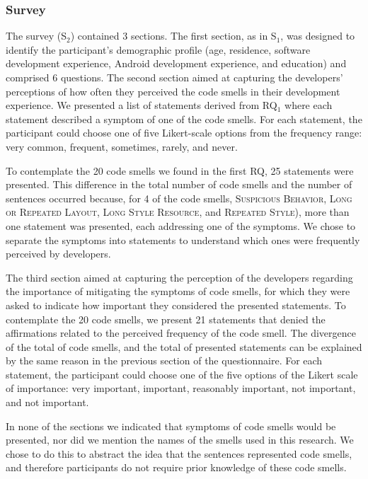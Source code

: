 \subsubsection{Survey}
\label{etapa-2-questionario}

The survey (S$_2$) contained 3 sections. 
The first section, as in S$_1$, was designed to identify the participant's demographic profile 
(age, residence, software development experience, Android development experience, and education) and comprised 6 questions.
The second section aimed at capturing the developers' perceptions of how often they perceived the code smells in their development experience. We presented a list of statements derived from RQ$_1$ where each statement described a symptom of one of the code smells. For each statement, the participant could choose one of five Likert-scale options from the frequency range: very common, frequent, sometimes, rarely, and never.


To contemplate the 20 code smells we found in the first RQ, 25 statements were presented. This difference in the total number of code smells and the number of sentences occurred because, for 4 of the code smells, \textsc{Suspicious Behavior}, 
\textsc{Long or Repeated Layout}, \textsc{Long Style Resource}, and \textsc{Repeated Style}), more than one statement was presented, each addressing one of the symptoms. We chose to separate the symptoms into statements to understand which ones were frequently perceived by developers. 


The third section aimed at capturing the perception of the developers regarding the importance of mitigating the symptoms of code smells, for which they were asked to indicate how important they considered the presented statements. To contemplate the 20 code smells, we present 21 statements that denied the affirmations related to the perceived frequency of the code smell. The divergence of the total of code smells, and the total of presented statements can be explained by the same reason in the previous section of the questionnaire. For each statement, the participant could choose one of the five options of the Likert scale of importance: very important, important, reasonably important, not important, and not important.


In none of the sections we indicated that symptoms of code smells would be presented, nor did we mention the names of the  smells used in this research. We chose to do this to abstract the idea that the sentences represented code smells, and therefore participants do not require prior knowledge of these code smells.

